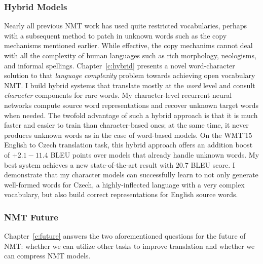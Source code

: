 \subsubsection{Hybrid Models} 
Nearly all previous NMT work has used quite restricted
vocabularies, perhaps with a subsequent method to patch in unknown words such as
the copy mechanisms mentioned earlier. While effective, the copy mechanims cannot deal with all the
complexity of human languages such as rich morphology, neologisms, and informal
spellings.
Chapter~\ref{c:hybrid} presents a novel word-character solution to that {\it
language complexity} problem towards achieving
open vocabulary NMT.
I build hybrid systems that translate mostly at the {\it word}
level and consult {\it character} components for rare words. 
My character-level recurrent neural networks compute source
word representations and recover unknown target words when needed.
The twofold advantage of such a hybrid approach is that it is much faster and easier to
train than character-based ones; at the same time, it never produces unknown words as in the case of word-based models. 
On the WMT'15 English to Czech translation task, 
this hybrid approach offers an addition boost of +$2.1{-}11.4$ BLEU points over models 
that already handle unknown words. 
My best system achieves a new state-of-the-art result with
$20.7$ BLEU score.
I demonstrate that my character models can successfully learn to not only generate well-formed words for Czech, a
highly-inflected language with a very complex vocabulary, but also build correct
representations for English source words.

\subsubsection{NMT Future} 
Chapter~\ref{c:future} answers the two aforementioned questions
for the future of NMT: whether we can utilize other tasks to improve
translation and whether we can compress NMT models. 

